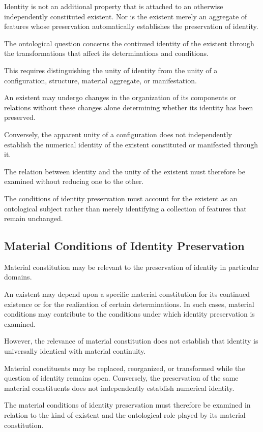 Identity is not an additional property that is
attached to an otherwise independently constituted
existent. Nor is the existent merely an aggregate
of features whose preservation automatically
establishes the preservation of identity.

The ontological question concerns the continued
identity of the existent through the transformations
that affect its determinations and conditions.

This requires distinguishing the unity of identity
from the unity of a configuration, structure,
material aggregate, or manifestation.

An existent may undergo changes in the organization
of its components or relations without these changes
alone determining whether its identity has been preserved.

Conversely, the apparent unity of a configuration
does not independently establish the numerical
identity of the existent constituted or manifested
through it.

The relation between identity and the unity of
the existent must therefore be examined without
reducing one to the other.

The conditions of identity preservation must account
for the existent as an ontological subject rather
than merely identifying a collection of features
that remain unchanged.

\subsection{Material Conditions of Identity Preservation}

Material constitution may be relevant to the
preservation of identity in particular domains.

An existent may depend upon a specific material
constitution for its continued existence or for
the realization of certain determinations. In such
cases, material conditions may contribute to the
conditions under which identity preservation is
examined.

However, the relevance of material constitution
does not establish that identity is universally
identical with material continuity.

Material constituents may be replaced, reorganized,
or transformed while the question of identity
remains open. Conversely, the preservation of
the same material constituents does not independently
establish numerical identity.

The material conditions of identity preservation
must therefore be examined in relation to the
kind of existent and the ontological role played
by its material constitution.


